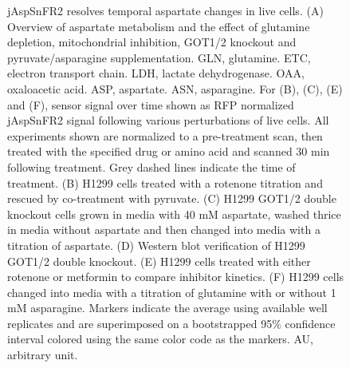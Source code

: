 \documentclass[9pt,lineno]{elife}
\begin{document}
\begin{figure}[ht!]
\centering
{}
\caption{
jAspSnFR2 resolves temporal aspartate changes in live cells.
(A) Overview of aspartate metabolism and the effect of glutamine depletion, mitochondrial inhibition, GOT1/2 knockout and pyruvate/asparagine supplementation.
GLN, glutamine.
ETC, electron transport chain.
LDH, lactate dehydrogenase.
OAA, oxaloacetic acid.
ASP, aspartate.
ASN, asparagine.
For (B), (C), (E) and (F), sensor signal over time shown as RFP normalized jAspSnFR2 signal following various perturbations of live cells.
All experiments shown are normalized to a pre-treatment scan, then treated with the specified drug or amino acid and scanned 30 min following treatment.
Grey dashed lines indicate the time of treatment.
(B) H1299 cells treated with a rotenone titration and rescued by co-treatment with pyruvate.
(C) H1299 GOT1/2 double knockout cells grown in media with 40 mM aspartate, washed thrice in media without aspartate and then changed into media with a titration of aspartate.
(D) Western blot verification of H1299 GOT1/2 double knockout.
(E) H1299 cells treated with either rotenone or metformin to compare inhibitor kinetics.
(F) H1299 cells changed into media with a titration of glutamine with or without 1 mM asparagine.
Markers indicate the average using available well replicates and are superimposed on a bootstrapped 95\% confidence interval colored using the same color code as the markers.
AU, arbitrary unit.
}
\end{figure}
\end{document}
